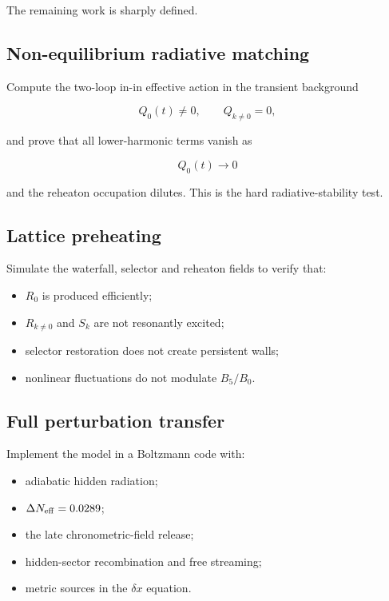 \documentclass[
  10pt,
]{article}
\providecommand{\tightlist}{%
  \setlength{\itemsep}{0pt}\setlength{\parskip}{0pt}}
\begin{document}
The remaining work is sharply defined.

\subsection{Non-equilibrium radiative
matching}\label{non-equilibrium-radiative-matching}

Compute the two-loop in-in effective action in the transient background

\[
Q_0(t)\neq0,
\qquad
Q_{k\neq0}=0,
\]

and prove that all lower-harmonic terms vanish as

\[
Q_0(t)\to0
\]

and the reheaton occupation dilutes. This is the hard
radiative-stability test.

\subsection{Lattice preheating}\label{lattice-preheating}

Simulate the waterfall, selector and reheaton fields to verify that:

\begin{itemize}
\tightlist
\item
  \(R_0\) is produced efficiently;
\item
  \(R_{k\neq0}\) and \(S_k\) are not resonantly excited;
\item
  selector restoration does not create persistent walls;
\item
  nonlinear fluctuations do not modulate \(B_5/B_0\).
\end{itemize}

\subsection{Full perturbation
transfer}\label{full-perturbation-transfer}

Implement the model in a Boltzmann code with:

\begin{itemize}
\tightlist
\item
  adiabatic hidden radiation;
\item
  \(\Delta N_{\rm eff}=0.0289\);
\item
  the late chronometric-field release;
\item
  hidden-sector recombination and free streaming;
\item
  metric sources in the \(\delta x\) equation.
\end{itemize}
\end{document}
